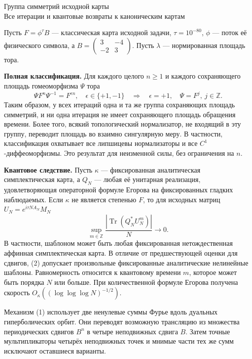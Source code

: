 \documentclass[11pt,a4paper]{article}
\newcommand{\Tr}{\operatorname{Tr}}
\newcommand{\Z}{\mathbb Z}
\begin{document}
\begin{center}{\LARGE\sffamily Группа симметрий исходной карты}\\[4pt]
{\large Все итерации и квантовые возвраты к каноническим картам}
\end{center}
Пусть $F=\phi^\tau B$ --- классическая карта исходной задачи, $\tau=10^{-80}$, $\phi$ --- поток её физического символа, а $B=\left(\begin{smallmatrix}3&-4\\-2&3\end{smallmatrix}\right)$. Пусть $\lambda$ --- нормированная площадь тора.

\textbf{Полная классификация.} Для каждого целого $n\ge1$ и каждого сохраняющего площадь гомеоморфизма $\Psi$ тора
\[
       \boxed{\ \Psi F^n\Psi^{-1}=F^{\epsilon n},\quad
             \epsilon\in\{+1,-1\}
             \quad\Longrightarrow\quad
             \epsilon=+1,\quad \Psi=F^j,\ j\in\Z.\ }                \tag{1}
\]
Таким образом, у всех итераций одна и та же группа сохраняющих площадь симметрий, и ни одна итерация не имеет сохраняющего площадь обращения времени. Более того, всякий топологический нормализатор, не входящий в эту группу, переводит площадь во взаимно сингулярную меру. В частности, классификация охватывает все липшицевы нормализаторы и все $C^1$-диффеоморфизмы. Это результат для неизменной силы, без ограничения на $n$.

\textbf{Квантовое следствие.} Пусть $\kappa$ --- фиксированная аналитическая симплектическая карта, а $Q_N$ --- любая её унитарная реализация, удовлетворяющая операторной формуле Егорова на фиксированных гладких наблюдаемых. Если $\kappa$ не является степенью $F$, то для исходных матриц $U_N=e^{i\tau NA_N}M_N$
\[
            \boxed{\quad
       \sup_{m\in\Z}\frac{|\Tr(Q_N^*U_N^m)|}{N}\longrightarrow0 .
             \quad}                                               \tag{2}
\]
В частности, шаблоном может быть любая фиксированная нетождественная аффинная симплектическая карта. В отличие от предшествующей оценки для сдвигов, (2) допускает произвольные фиксированные аналитические нелинейные шаблоны. Равномерность относится к квантовому времени $m$, которое может быть порядка $N$ или больше. При количественной формуле Егорова получена скорость $O_\kappa((\log\log\log N)^{-1/2})$.

Механизм (1) использует две ненулевые суммы Фурье вдоль дуальных гиперболических орбит. Они переводят возможную трансляцию из множества периодических сдвигов $B^n$ в четыре неподвижных сдвига $B$. Затем точные мультипликаторы четырёх неподвижных точек и мнимые части тех же сумм исключают оставшиеся варианты.
\end{document}

